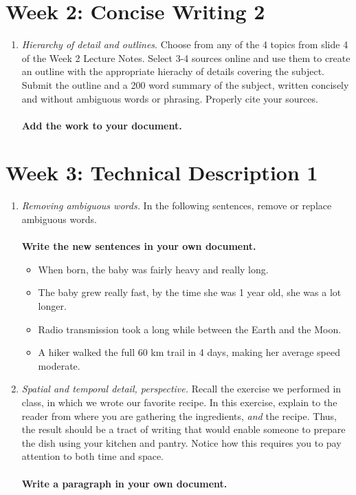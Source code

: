 \documentclass{article}
\begin{document}
\section{Week 2: Concise Writing 2}

\begin{enumerate}
\item \textit{Hierarchy of detail and outlines}.  Choose from any of the 4 topics from slide 4 of the Week 2 Lecture Notes.  Select 3-4 sources online and use them to create an outline with the appropriate hierachy of details covering the subject.  Submit the outline and a 200 word summary of the subject, written concisely and without ambiguous words or phrasing. Properly cite your sources. \\ \\
\textbf{Add the work to your document.}
\end{enumerate}

\section{Week 3: Technical Description 1}

\begin{enumerate}
\item \textit{Removing ambiguous words.}  In the following sentences, remove or replace ambiguous words. \\ \\
\textbf{Write the new sentences in your own document.} 
\begin{itemize}
\item When born, the baby was fairly heavy and really long.
\item The baby grew really fast, by the time she was 1 year old, she was a lot longer.
\item Radio transmission took a long while between the Earth and the Moon.
\item A hiker walked the full 60 km trail in 4 days, making her average speed moderate.
\end{itemize}
\item \textit{Spatial and temporal detail, perspective.}  Recall the exercise we performed in class, in which we wrote our favorite recipe.  In this exercise, explain to the reader from where you are gathering the ingredients, \textit{and} the recipe.  Thus, the result should be a tract of writing that would enable someone to prepare the dish using your kitchen and pantry. Notice how this requires you to pay attention to both time and space. \\ \\
\textbf{Write a paragraph in your own document.} 
\end{enumerate}
\end{document}
